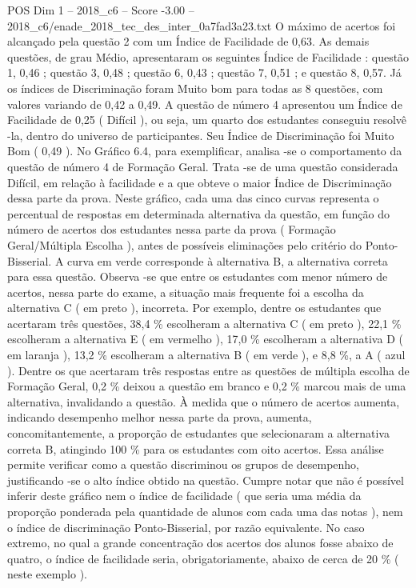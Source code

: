 \begin{textsample}{POS Dim 1 – 2018\_c6 – Score -3.00 – 2018\_c6/enade\_2018\_tec\_des\_inter\_0a7fad3a23.txt}
O máximo de acertos foi alcançado pela questão 2 com um Índice de Facilidade de 0,63.
As demais questões, de grau Médio, apresentaram os seguintes Índice de Facilidade : questão 1, 0,46 ; questão 3, 0,48 ; questão 6, 0,43 ; questão 7, 0,51 ; e questão 8, 0,57.
Já os índices de Discriminação foram Muito bom para todas as 8 questões, com valores variando de 0,42 a 0,49.
A questão de número 4 apresentou um Índice de Facilidade de 0,25 ( Difícil ), ou seja, um quarto dos estudantes conseguiu resolvê -la, dentro do universo de participantes.
Seu Índice de Discriminação foi Muito Bom ( 0,49 ).
No Gráfico 6.4, para exemplificar, analisa -se o comportamento da questão de número 4 de Formação Geral.
Trata -se de uma questão considerada Difícil, em relação à facilidade e a que obteve o maior Índice de Discriminação dessa parte da prova.
Neste gráfico, cada uma das cinco curvas representa o percentual de respostas em determinada alternativa da questão, em função do número de acertos dos estudantes nessa parte da prova ( Formação Geral/Múltipla Escolha ), antes de possíveis eliminações pelo critério do Ponto-Bisserial.
A curva em verde corresponde à alternativa B, a alternativa correta para essa questão.
Observa -se que entre os estudantes com menor número de acertos, nessa parte do exame, a situação mais frequente foi a escolha da alternativa C ( em preto ), incorreta.
Por exemplo, dentre os estudantes que acertaram três questões, 38,4 \% escolheram a alternativa C ( em preto ), 22,1 \% escolheram a alternativa E ( em vermelho ), 17,0 \% escolheram a alternativa D ( em laranja ), 13,2 \% escolheram a alternativa B ( em verde ), e 8,8 \%, a A ( azul ).
Dentre os que acertaram três respostas entre as questões de múltipla escolha de Formação Geral, 0,2 \% deixou a questão em branco e 0,2 \% marcou mais de uma alternativa, invalidando a questão.
À medida que o número de acertos aumenta, indicando desempenho melhor nessa parte da prova, aumenta, concomitantemente, a proporção de estudantes que selecionaram a alternativa correta B, atingindo 100 \% para os estudantes com oito acertos.
Essa análise permite verificar como a questão discriminou os grupos de desempenho, justificando -se o alto índice obtido na questão.
Cumpre notar que não é possível inferir deste gráfico nem o índice de facilidade ( que seria uma média da proporção ponderada pela quantidade de alunos com cada uma das notas ), nem o índice de discriminação Ponto-Bisserial, por razão equivalente.
No caso extremo, no qual a grande concentração dos acertos dos alunos fosse abaixo de quatro, o índice de facilidade seria, obrigatoriamente, abaixo de cerca de 20 \% ( neste exemplo ).

\end{textsample}
